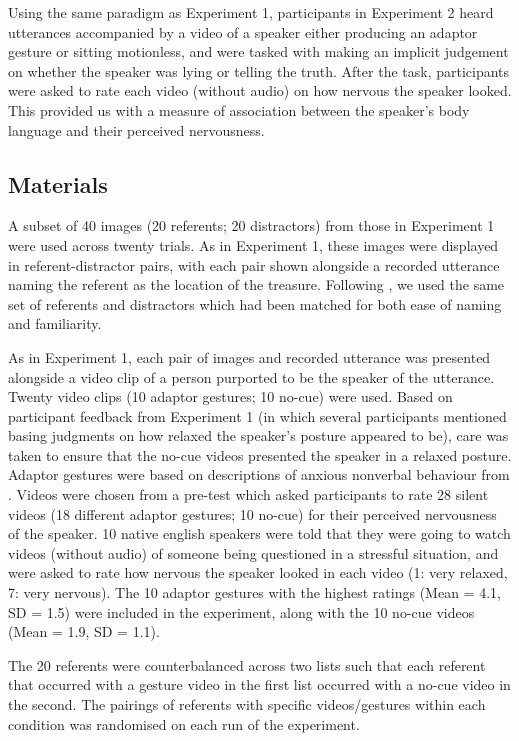\documentclass[a4paper,man,natbib]{apa6}
\begin{document}
Using the same paradigm as Experiment 1, participants in Experiment 2 heard utterances accompanied by a video of a speaker either producing an adaptor gesture or sitting motionless, and were tasked with making an implicit judgement on whether the speaker was lying or telling the truth. 
After the task, participants were asked to rate each video (without audio) on how nervous the speaker looked.
This provided us with a measure of association between the speaker's body language and their perceived nervousness.

\subsection{Materials}
A subset of 40 images (20 referents; 20 distractors) from those in Experiment 1 were used across twenty trials.
As in Experiment 1, these images were displayed in referent-distractor pairs, with each pair shown alongside a recorded utterance naming the referent as the location of the treasure.
Following \citet{Loy2017}, we used the same set of referents and distractors which had been matched for both ease of naming and familiarity.

As in Experiment 1, each pair of images and recorded utterance was presented alongside a video clip of a person purported to be the speaker of the utterance.
Twenty video clips (10 adaptor gestures; 10 no-cue) were used. 
Based on participant feedback from Experiment 1 (in which several participants mentioned basing judgments on how relaxed the speaker's posture appeared to be), care was taken to ensure that the no-cue videos presented the speaker in a relaxed posture. 
Adaptor gestures were based on descriptions of anxious nonverbal behaviour from \citet{Gregersen2005}.
Videos were chosen from a pre-test which asked participants to rate 28 silent videos (18 different adaptor gestures; 10 no-cue) for their perceived nervousness of the speaker. 
10 native english speakers were told that they were going to watch videos (without audio) of someone being questioned in a stressful situation, and were asked to rate how nervous the speaker looked in each video (1: very relaxed, 7: very nervous). 
The 10 adaptor gestures with the highest ratings (Mean = 4.1, SD = 1.5) were included in the experiment, along with the 10 no-cue videos (Mean = 1.9, SD = 1.1).

The 20 referents were counterbalanced across two lists such that each referent that occurred with a gesture video in the first list occurred with a no-cue video in the second.
The pairings of referents with specific videos/gestures within each condition was randomised on each run of the experiment.
\end{document}
